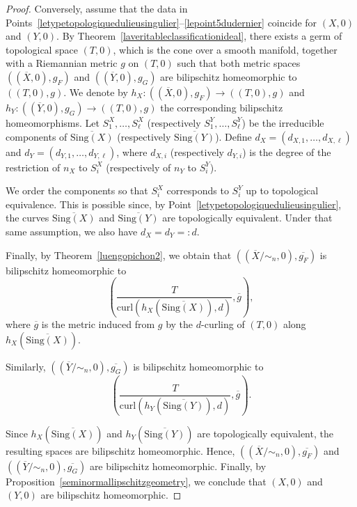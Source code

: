 \documentclass[reqno,dvipsnames,12pt]{amsart}
\begin{document}
\begin{proof}
Conversely, assume that the data in Points~\ref{letypetopologiquedulieusingulier}--\ref{lepoint5dudernier} coincide for $(X,0)$ and $(Y,0)$. By Theorem~\ref{laveritableclassificationideal}, there exists a germ of topological space $(T,0)$, which is the cone over a smooth manifold, together with a Riemannian metric $g$ on $(T,0)$ such that both metric spaces
$((\overline{X},0),g_F)$ and $((\overline{Y},0),g_G)$
are bilipschitz homeomorphic to $((T,0),g)$. We denote by
$h_X:((\overline{X},0),g_F)\to((T,0),g)$ and
$h_Y:((\overline{Y},0),g_G)\to((T,0),g)$
the corresponding bilipschitz homeomorphisms. Let $S_1^X,\dots,S_\ell^X$ (respectively $S_1^Y,\dots,S_\ell^Y$) be the irreducible components of $\overline{\mathrm{Sing}(X)}$ (respectively $\overline{\mathrm{Sing}(Y)}$). Define
$d_X=(d_{X,1},\dots,d_{X,\ell})$ and $d_Y=(d_{Y,1},\dots,d_{Y,\ell})$,
where $d_{X,i}$ (respectively $d_{Y,i}$) is the degree of the restriction of $n_X$ to $S_i^X$ (respectively of $n_Y$ to $S_i^Y$).

We order the components so that $S_i^X$ corresponds to $S_i^Y$ up to topological equivalence. This is possible since, by Point~\ref{letypetopologiquedulieusingulier}, the curves $\overline{\mathrm{Sing}(X)}$ and $\overline{\mathrm{Sing}(Y)}$ are topologically equivalent. Under that same  assumption, we also have $d_X=d_Y=:d$.

Finally, by Theorem~\ref{luengopichon2}, we obtain that
$\left((\overline{X}/\sim_n,0),\overline{g_F}\right)$
is bilipschitz homeomorphic to
$$\left(\frac{T}{\mathrm{curl}\left(h_X\left(\overline{\mathrm{Sing}(X)}\right),d\right)},\overline{g}\right),$$
where $\overline{g}$ is the metric induced from $g$ by the $d$-curling of $(T,0)$ along $h_X(\overline{\mathrm{Sing}(X)})$.

Similarly,
$\left((\overline{Y}/\sim_n,0),\overline{g_G}\right)$
is bilipschitz homeomorphic to
$$\left(\frac{T}{\mathrm{curl}\left(h_Y\left(\overline{\mathrm{Sing}(Y)}\right),d\right)},\overline{g}\right).$$

Since $h_X(\overline{\mathrm{Sing}(X)})$ and $h_Y(\overline{\mathrm{Sing}(Y)})$ are topologically equivalent, the resulting  spaces are bilipschitz homeomorphic. Hence,
$\left((\overline{X}/\sim_n,0),\overline{g_F}\right)$
and
$\left((\overline{Y}/\sim_n,0),\overline{g_G}\right)$
are bilipschitz homeomorphic. Finally, by Proposition~\ref{seminormallipschitzgeometry}, we conclude that $(X,0)$ and $(Y,0)$ are bilipschitz homeomorphic.


\end{proof}
\end{document}
